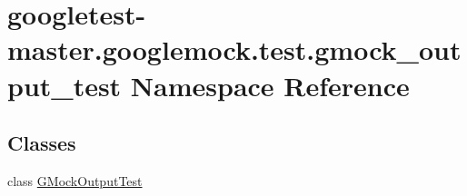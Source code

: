 \hypertarget{namespacegoogletest-master_1_1googlemock_1_1test_1_1gmock__output__test}{}\section{googletest-\/master.googlemock.\+test.\+gmock\+\_\+output\+\_\+test Namespace Reference}
\label{namespacegoogletest-master_1_1googlemock_1_1test_1_1gmock__output__test}
\subsection*{Classes}
\begin{DoxyCompactItemize}
\item 
class \mbox{\hyperlink{classgoogletest-master_1_1googlemock_1_1test_1_1gmock__output__test_1_1_g_mock_output_test}{G\+Mock\+Output\+Test}}
\end{DoxyCompactItemize}
